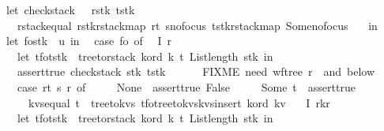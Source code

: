 \begin{isabellebody}
\ \ let\ check{\isacharunderscore}stack\ {\isacharequal}\ {\isacharpercent}\ rstk\ tstk{\isachardot}\ \isanewline
\ \ \ \ rstack{\isacharunderscore}equal\ {\isacharparenleft}rstk{\isacharbar}{\isachargreater}rstack{\isacharunderscore}map\ {\isacharparenleft}r{}t\ s{\isacharparenright}{\isacharbar}{\isachargreater}no{\isacharunderscore}focus{\isacharparenright}\ {\isacharparenleft}tstk{\isacharbar}{\isachargreater}rstack{\isacharunderscore}map\ Some{\isacharbar}{\isachargreater}no{\isacharunderscore}focus{\isacharparenright}\ \isanewline
\ \ in\isanewline
\ \ let\ {\isacharparenleft}fo{\isacharcomma}stk{\isacharparenright}\ {\isacharequal}\ u\ in\isanewline
\ \ case\ fo\ of\isanewline
\ \ I{}\ r\ {\isasymRightarrow}\ {\isacharparenleft}\isanewline
\ \ \ \ let\ {\isacharparenleft}t{\isacharunderscore}fo{\isacharcomma}t{\isacharunderscore}stk{\isacharparenright}\ {\isacharequal}\ tree{\isacharunderscore}to{\isacharunderscore}rstack\ k{\isacharunderscore}ord\ k\ t{}\ {\isacharparenleft}List{\isachardot}length\ stk{\isacharparenright}\ in\isanewline
\ \ \ \ assert{\isacharunderscore}true\ {\isacharparenleft}check{\isacharunderscore}stack\ stk\ t{\isacharunderscore}stk{\isacharparenright}\ {\isacharampersand}\isanewline
\ \ \ \ {\isacharparenleft}{\isacharasterisk}\ FIXME\ need\ wf{\isacharunderscore}tree\ r\ {\isacharcomma}\ and\ below\ {\isacharasterisk}{\isacharparenright}\isanewline
\ \ \ \ {\isacharparenleft}case\ {\isacharparenleft}r{}t\ s\ r{\isacharparenright}\ of\ \isanewline
\ \ \ \ None\ {\isasymRightarrow}\ assert{\isacharunderscore}true\ {\isacharparenleft}False{\isacharparenright}\isanewline
\ \ \ \ {\isacharbar}\ Some\ t{\isacharprime}\ {\isasymRightarrow}\ assert{\isacharunderscore}true\ {\isacharparenleft}\isanewline
\ \ \ \ \ \ kvs{\isacharunderscore}equal\ {\isacharparenleft}t{\isacharprime}\ {\isacharbar}{\isachargreater}\ tree{\isacharunderscore}to{\isacharunderscore}kvs{\isacharparenright}\ {\isacharparenleft}t{\isacharunderscore}fo{\isacharbar}{\isachargreater}tree{\isacharunderscore}to{\isacharunderscore}kvs{\isacharbar}{\isachargreater}kvs{\isacharunderscore}insert\ k{\isacharunderscore}ord\ {\isacharparenleft}k{\isacharcomma}v{\isacharparenright}{\isacharparenright}{\isacharparenright}{\isacharparenright}{\isacharparenright}\isanewline
\ \ {\isacharbar}\ I{}\ {\isacharparenleft}r{}{\isacharcomma}k{\isacharprime}{\isacharcomma}r{}{\isacharparenright}\ {\isasymRightarrow}\ {\isacharparenleft}\isanewline
\ \ \ \ let\ {\isacharparenleft}t{\isacharunderscore}fo{\isacharcomma}t{\isacharunderscore}stk{\isacharparenright}\ {\isacharequal}\ tree{\isacharunderscore}to{\isacharunderscore}rstack\ k{\isacharunderscore}ord\ k\ t{}\ {\isacharparenleft}List{\isachardot}length\ stk{\isacharparenright}\ in\isanewline

\end{isabellebody}

